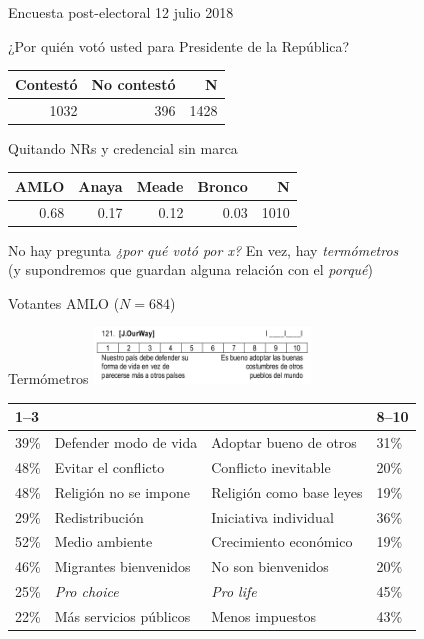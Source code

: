\documentclass[bigger]{beamer}
\begin{document}
\begin{frame}[<+->][label={sec:org9168415}]{Encuesta post-electoral 12 julio 2018}
\begin{block}{¿Por quién votó usted para Presidente de la República?}
\begin{center}
\begin{tabular}{rrr}
Contestó & No contestó & N\\[0pt]
\hline
1032 & 396 & 1428\\[0pt]
\end{tabular}
\end{center}
\end{block}
\begin{block}{Quitando NRs y credencial sin marca}
\begin{center}
\begin{tabular}{rrrrr}
AMLO & Anaya & Meade & Bronco & N\\[0pt]
\hline
0.68 & 0.17 & 0.12 & 0.03 & 1010\\[0pt]
\end{tabular}
\end{center}
\end{block}
\begin{block}{No hay pregunta \emph{¿por qué votó por x?}}
En vez, hay \emph{termómetros} \\[0pt]
(y supondremos que guardan alguna relación con el \emph{porqué})
\end{block}
\end{frame}
\begin{frame}[label={sec:org042fa7c}]{Votantes AMLO (\(N = 684\))}
\begin{block}{Termómetros}
\centering
\includegraphics[height=1.5cm]{./pics/q121.png}
\footnotesize
\begin{center}
\begin{tabular}{llll}
1--3 &  &  & 8--10\\[0pt]
\hline
39\% & Defender modo de vida & Adoptar bueno de otros & 31\%\\[0pt]
48\% & Evitar el conflicto & Conflicto inevitable & 20\%\\[0pt]
48\% & Religión no se impone & Religión como base leyes & 19\%\\[0pt]
29\% & Redistribución & Iniciativa individual & 36\%\\[0pt]
52\% & Medio ambiente & Crecimiento económico & 19\%\\[0pt]
46\% & Migrantes bienvenidos & No son bienvenidos & 20\%\\[0pt]
25\% & \emph{Pro choice} & \emph{Pro life} & 45\%\\[0pt]
22\% & Más servicios públicos & Menos impuestos & 43\%\\[0pt]
\end{tabular}
\end{center}
\end{block}
\end{frame}
\end{document}
